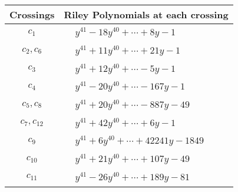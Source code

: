\documentclass[1p]{elsarticle_modified}
\theoremstyle{definition}
\begin{document}
\begin{tabular}{m{50pt}|m{274pt}}
Crossings & \hspace{64pt}Riley Polynomials at each crossing \\
\hline $$\begin{aligned}c_{1}\end{aligned}$$&$\begin{aligned}
&y^{41}-18 y^{40}+\cdots+8 y-1
\end{aligned}$\\
\hline $$\begin{aligned}c_{2},c_{6}\end{aligned}$$&$\begin{aligned}
&y^{41}+11 y^{40}+\cdots+21 y-1
\end{aligned}$\\
\hline $$\begin{aligned}c_{3}\end{aligned}$$&$\begin{aligned}
&y^{41}+12 y^{40}+\cdots-5 y-1
\end{aligned}$\\
\hline $$\begin{aligned}c_{4}\end{aligned}$$&$\begin{aligned}
&y^{41}-20 y^{40}+\cdots-167 y-1
\end{aligned}$\\
\hline $$\begin{aligned}c_{5},c_{8}\end{aligned}$$&$\begin{aligned}
&y^{41}+20 y^{40}+\cdots-887 y-49
\end{aligned}$\\
\hline $$\begin{aligned}c_{7},c_{12}\end{aligned}$$&$\begin{aligned}
&y^{41}+42 y^{40}+\cdots+6 y-1
\end{aligned}$\\
\hline $$\begin{aligned}c_{9}\end{aligned}$$&$\begin{aligned}
&y^{41}+6 y^{40}+\cdots+42241 y-1849
\end{aligned}$\\
\hline $$\begin{aligned}c_{10}\end{aligned}$$&$\begin{aligned}
&y^{41}+21 y^{40}+\cdots+107 y-49
\end{aligned}$\\
\hline $$\begin{aligned}c_{11}\end{aligned}$$&$\begin{aligned}
&y^{41}-26 y^{40}+\cdots+189 y-81
\end{aligned}$\\
\hline
\end{tabular}\\~\\
\end{document}

